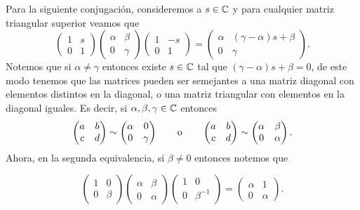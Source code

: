 Para la siguiente conjugación, consideremos a $s \in \mathbb{C}$ y para cualquier matriz triangular superior veamos que
\begin{equation}
  \begin{pmatrix} 1 & s \\ 0 & 1 \end{pmatrix}
  \begin{pmatrix} \alpha & \beta \\ 0 & \gamma \end{pmatrix}
  \begin{pmatrix} 1 & -s \\ 0 & 1 \end{pmatrix}
    = \begin{pmatrix} \alpha & (\gamma-\alpha)s + \beta \\ 0 & \gamma \end{pmatrix}.
\end{equation}
Notemos que si $\alpha \neq \gamma$  entonces existe $s \in \mathbb{C}$ tal que $(\gamma-\alpha)s + \beta = 0$, de este modo tenemos que las matrices pueden ser semejantes a una matriz diagonal con elementos distintos en la diagonal, o una matriz triangular con elementos en la diagonal iguales. Es decir, si $\alpha, \beta, \gamma \in \mathbb{C}$ entonces
\[
  \begin{pmatrix} a & b \\ c & d \end{pmatrix} \sim \begin{pmatrix} \alpha & 0 \\ 0 & \gamma \end{pmatrix}
    \qquad\text{o}\qquad
    \begin{pmatrix} a & b \\ c & d \end{pmatrix} \sim \begin{pmatrix} \alpha & \beta \\ 0 & \alpha \end{pmatrix}.
\]
Ahora, en la segunda equivalencia, si $\beta \neq 0$ entonces notemos que

\begin{equation}
  \begin{pmatrix} 1 & 0 \\ 0 & \beta \end{pmatrix}
  \begin{pmatrix} \alpha & \beta \\ 0 & \alpha \end{pmatrix}
  \begin{pmatrix} 1 & 0 \\ 0 & \beta^{-1} \end{pmatrix}
    = \begin{pmatrix} \alpha & 1 \\ 0 & \alpha \end{pmatrix}.
\end{equation}


